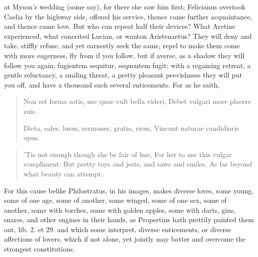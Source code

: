 at Myson's wedding (some say), for there she saw him first; Felicianus
overtook Caelia by the highway side, offered his service, thence came
further acquaintance, and thence came love. But who can repeat half
their devices? What Aretine experienced, what conceited Lucian, or
wanton Aristenaetus? They will deny and take, stiffly refuse, and yet
earnestly seek the same, repel to make them come with more eagerness,
fly from if you follow, but if averse, as a shadow they will follow you
again, fugientem sequitur, sequentem fugit; with a regaining retreat, a
gentle reluctancy, a smiling threat, a pretty pleasant peevishness they
will put you off, and have a thousand such several enticements. For as
he saith,

\begin{latin}
\begin{verse}
Non est forma satis, nec quae vult bella videri,
Debet vulgari more placere suis.

Dicta, sales, lusus, sermones, gratia, risus,
Vincunt naturae candidioris opus.
\end{verse}
\end{latin}
\translationrule%
\begin{verse}%
'Tis not enough though she be fair of hue,
For her to use this vulgar compliment:
But pretty toys and jests, and saws and smiles,
As far beyond what beauty can attempt.
\end{verse}%

For this cause belike Philostratus, in his images, makes diverse
loves, some young, some of one age, some of another, some winged, some
of one sex, some of another, some with torches, some with golden
apples, some with darts, gins, snares, and other engines in their
hands, as Propertius hath prettily painted them out, lib. 2. et 29. and
which some interpret, diverse enticements, or diverse affections of
lovers, which if not alone, yet jointly may batter and overcome the
strongest constitutions.

